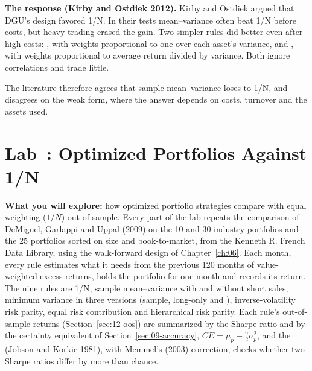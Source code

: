 \textbf{The response (Kirby and Ostdiek 2012).} Kirby and Ostdiek argued that DGU's design favored 1/N. In their tests mean--variance often beat 1/N before costs, but heavy trading erased the gain. Two simpler rules did better even after high costs: , with weights proportional to one over each asset's variance, and , with weights proportional to average return divided by variance. Both ignore correlations and trade little.

The literature therefore agrees that sample mean--variance loses to 1/N, and disagrees on the weak form, where the answer depends on costs, turnover and the assets used.

\section{Lab~\thechapter: Optimized Portfolios Against 1/N}
\label{sec:12-lab}

\textbf{What you will explore:} how optimized portfolio strategies compare with equal weighting ($1/N$) out of sample. Every part of the lab repeats the comparison of DeMiguel, Garlappi and Uppal (2009) on the 10 and 30 industry portfolios and the 25 portfolios sorted on size and book-to-market, from the Kenneth R. French Data Library, using the walk-forward design of Chapter~\ref{ch:06}. Each month, every rule estimates what it needs from the previous 120 months of value-weighted excess returns, holds the portfolio for one month and records its return. The nine rules are 1/N, sample mean--variance with and without short sales, minimum variance in three versions (sample, long-only and ), inverse-volatility risk parity, equal risk contribution and hierarchical risk parity. Each rule's out-of-sample returns (Section~\ref{sec:12-oos}) are summarized by the Sharpe ratio and by the certainty equivalent of Section~\ref{sec:09-accuracy}, $CE = \mu_p - \frac{\gamma}{2}\sigma_p^2$, and the  (Jobson and Korkie 1981), with Memmel's (2003) correction, checks whether two Sharpe ratios differ by more than chance.


